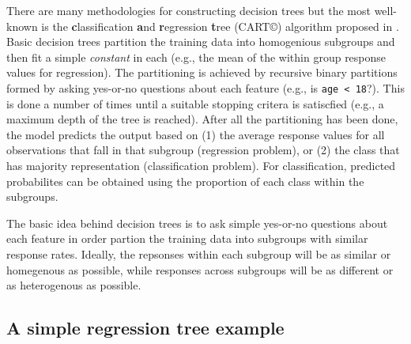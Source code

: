 \documentclass[]{book}
\theoremstyle{definition}
\theoremstyle{definition}
\theoremstyle{definition}
\theoremstyle{remark}
\begin{document}
There are many methodologies for constructing decision trees but the
most well-known is the \textbf{c}lassification \textbf{a}nd
\textbf{r}egression \textbf{t}ree (CART©) algorithm proposed in
\citet{breiman2017classification}. Basic decision trees partition the
training data into homogenious subgroups and then fit a simple
\emph{constant} in each (e.g., the mean of the within group response
values for regression). The partitioning is achieved by recursive binary
partitions formed by asking yes-or-no questions about each feature
(e.g., is \texttt{age\ \textless{}\ 18}?). This is done a number of
times until a suitable stopping critera is satiscfied (e.g., a maximum
depth of the tree is reached). After all the partitioning has been done,
the model predicts the output based on (1) the average response values
for all observations that fall in that subgroup (regression problem), or
(2) the class that has majority representation (classification problem).
For classification, predicted probabilites can be obtained using the
proportion of each class within the subgroups.

\begin{tip}
The basic idea behind decision trees is to ask simple yes-or-no
questions about each feature in order partion the training data into
subgroups with similar response rates. Ideally, the repsonses within
each subgroup will be as similar or homegenous as possible, while
responses across subgroups will be as different or as heterogenous as
possible.
\end{tip}

\hypertarget{a-simple-regression-tree-example}{%
\subsection{A simple regression tree
example}\label{a-simple-regression-tree-example}}
\end{document}
